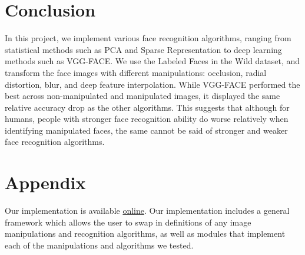 \documentclass[pageno]{cos429}
\begin{document}
\section{Conclusion}
In this project, we implement various face recognition algorithms, ranging from statistical methods such as PCA and Sparse Representation to deep learning methods such as VGG-FACE. We use the Labeled Faces in the Wild dataset, and transform the face images with different manipulations: occlusion, radial distortion, blur, and deep feature interpolation. While VGG-FACE performed the best across non-manipulated and manipulated images, it displayed the same relative accuracy drop as the other algorithms. This suggests that although for humans, people with stronger face recognition ability do worse relatively when identifying manipulated faces, the same cannot be said of stronger and weaker face recognition algorithms.



 
\section{Appendix}\label{sec:Appendix}
Our implementation is available \href{https://github.com/cchen23/COS429_final_project}{online}. Our implementation includes a general framework which allows the user to swap in definitions of any image manipulations and recognition algorithms, as well as modules that implement each of the manipulations and algorithms we tested.
\end{document}
